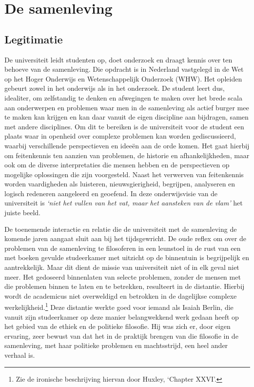 \documentclass[smallauthor, chapterhaspagenum, nochapterinheader, pagenuminheader,  bigchapnum,medium2, tocpages, garamond, titleinheader]{jote-book}
\begin{document}
	\chapter{De samenleving }



	\section{Legitimatie }



	De universiteit leidt studenten op, doet onderzoek en draagt kennis over ten behoeve van de samenleving. Die opdracht is in Nederland vastgelegd in de Wet op het Hoger Onderwijs en Wetenschappelijk Onderzoek (WHW). Het opleiden gebeurt zowel in het onderwijs als in het onderzoek. De student leert dus, idealiter, om zelfstandig te denken en afwegingen te maken over het brede scala aan onderwerpen en problemen waar men in de samenleving als actief burger mee te maken kan krijgen en kan daar vanuit de eigen discipline aan bijdragen, samen met andere disciplines. Om dit te bereiken is de universiteit voor de student een plaats waar in openheid over complexe problemen kan worden gediscussieerd, waarbij verschillende perspectieven en ideeën aan de orde komen. Het gaat hierbij om feitenkennis ten aanzien van problemen, de historie en afhankelijkheden, maar ook om de diverse interpretaties die mensen hebben en de perspectieven op mogelijke oplossingen die zijn voorgesteld. Naast het verwerven van feitenkennis worden vaardigheden als luisteren, nieuwsgierigheid, begrijpen, analyseren en logisch redeneren aangeleerd en geoefend. In deze onderwijsvisie van de universiteit is \emph{‘niet het vullen van het vat, maar het aansteken van de vlam'} het juiste beeld.



	De toenemende interactie en relatie die de universiteit met de samenleving de komende jaren aangaat sluit aan bij het tijdsgewricht. De oude reflex om over de problemen van de samenleving te filosoferen in een leunstoel in de rust van een met boeken gevulde studeerkamer met uitzicht op de binnentuin is begrijpelijk en aantrekkelijk. Maar dit dient de missie van universiteit niet of in elk geval niet meer. Het gedoseerd binnenlaten van selecte problemen, zonder de mensen met die problemen binnen te laten en te betrekken, resulteert in de distantie. Hierbij wordt de academicus niet overweldigd en betrokken in de dagelijkse complexe werkelijkheid.\footnote{Zie de ironische beschrijving hiervan door Huxley, ‘Chapter XXVI'.} Deze distantie werkte goed voor iemand als Isaiah Berlin, die vanuit zijn studeerkamer op deze manier belangwekkend werk gedaan heeft op het gebied van de ethiek en de politieke filosofie. Hij was zich er, door eigen ervaring, zeer bewust van dat het in de praktijk brengen van die filosofie in de samenleving, met haar politieke problemen en machtsstrijd, een heel ander verhaal is.
\end{document}
